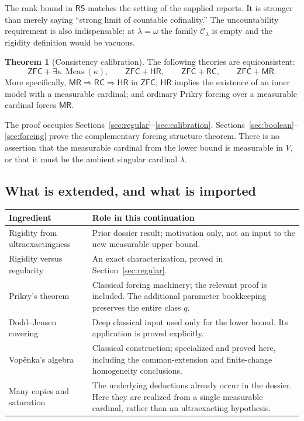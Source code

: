 \documentclass[11pt,letterpaper]{article}
\theoremstyle{definition}
\newtheorem{theorem}[definition]{Theorem}
\numberwithin{equation}{section}
\newcommand{\ZFC}{\mathsf{ZFC}}
\newcommand{\Clam}{\mathcal C_\lambda}
\newcommand{\Meas}{\operatorname{Meas}}
\newcommand{\RS}{\mathsf{RS}}
\newcommand{\RC}{\mathsf{RC}}
\newcommand{\MR}{\mathsf{MR}}
\newcommand{\HR}{\mathsf{HR}}
\begin{document}
The rank bound in $\RS$ matches the setting of the supplied reports. It is
stronger than merely saying ``strong limit of countable cofinality.'' The
uncountability requirement is also indispensable: at $\lambda=\omega$ the
family $\Clam$ is empty and the rigidity definition would be vacuous.

\begin{theorem}[Consistency calibration]\label{thm:main}
The following theories are equiconsistent:
\[
 \ZFC+\exists\kappa\,\Meas(\kappa),\qquad
 \ZFC+\HR,\qquad \ZFC+\RC,\qquad \ZFC+\MR.
\]
More specifically, $\MR\Rightarrow\RC\Rightarrow\HR$ in $\ZFC$;
$\HR$ implies the existence of an inner model with a measurable cardinal;
and ordinary Prikry forcing over a measurable cardinal forces $\MR$.
\end{theorem}

The proof occupies Sections~\ref{sec:regular}--\ref{sec:calibration}.
Sections~\ref{sec:boolean}--\ref{sec:forcing} prove the complementary forcing
structure theorem. There is no assertion that the measurable cardinal from the
lower bound is measurable in $V$, or that it must be the ambient singular
cardinal $\lambda$.

\subsection{What is extended, and what is imported}

\begin{center}
\small
\begin{tabularx}{\textwidth}{@{}P{.27\textwidth}Y@{}}
\toprule
Ingredient & Role in this continuation\\
\midrule
Rigidity from ultraexactingness & Prior dossier result; motivation only, not an input to the new measurable upper bound.\\
Rigidity versus regularity & An exact characterization, proved in Section~\ref{sec:regular}.\\
Prikry's theorem & Classical forcing machinery; the relevant proof is included. The additional parameter bookkeeping preserves the entire class $q$.\\
Dodd--Jensen covering & Deep classical input used only for the lower bound. Its application is proved explicitly.\\
Vop\v enka's algebra & Classical construction; specialized and proved here, including the common-extension and finite-change homogeneity conclusions.\\
Many copies and saturation & The underlying deductions already occur in the dossier. Here they are realized from a single measurable cardinal, rather than an ultraexacting hypothesis.\\
\bottomrule
\end{tabularx}
\end{center}
\end{document}
